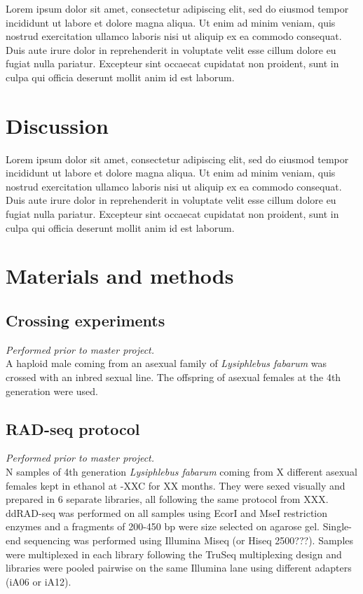\documentclass[11pt,a4paper]{report}
\begin{document}
Lorem ipsum dolor sit amet, consectetur adipiscing elit, sed do eiusmod tempor incididunt ut labore et dolore magna aliqua. Ut enim ad minim veniam, quis nostrud exercitation ullamco laboris nisi ut aliquip ex ea commodo consequat. Duis aute irure dolor in reprehenderit in voluptate velit esse cillum dolore eu fugiat nulla pariatur. Excepteur sint occaecat cupidatat non proident, sunt in culpa qui officia deserunt mollit anim id est laborum.

\FloatBarrier

\section*{Discussion}

Lorem ipsum dolor sit amet, consectetur adipiscing elit, sed do eiusmod tempor incididunt ut labore et dolore magna aliqua. Ut enim ad minim veniam, quis nostrud exercitation ullamco laboris nisi ut aliquip ex ea commodo consequat. Duis aute irure dolor in reprehenderit in voluptate velit esse cillum dolore eu fugiat nulla pariatur. Excepteur sint occaecat cupidatat non proident, sunt in culpa qui officia deserunt mollit anim id est laborum.

\section*{Materials and methods}

\subsection*{Crossing experiments}
\textit{Performed prior to master project.}\\
A haploid male coming from an asexual family of \textit{Lysiphlebus fabarum} was crossed with an inbred sexual line. The offspring of asexual females at the 4th generation were used.

\subsection*{RAD-seq protocol}
\textit{Performed prior to master project.}\\
N samples of 4th generation \textit{Lysiphlebus fabarum } coming from X different asexual females kept in ethanol at -XX\degree C for XX months. They were sexed visually and prepared in 6 separate libraries, all following the same protocol from XXX. ddRAD-seq was performed on all samples using EcorI and MseI restriction enzymes and a fragments  of 200-450 bp were size selected on agarose gel. Single-end sequencing was performed using Illumina Miseq (or Hiseq 2500???). Samples were multiplexed in each library following the TruSeq multiplexing design and libraries were pooled pairwise on the same Illumina lane using different adapters (iA06 or iA12).
\end{document}
